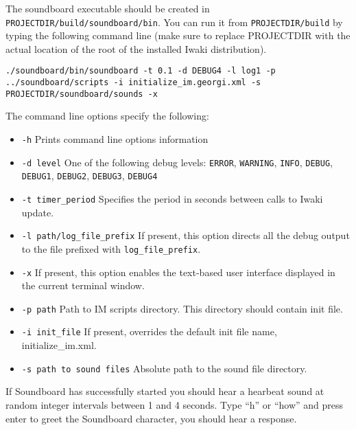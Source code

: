 The soundboard executable should be created in \texttt{PROJECTDIR/build/soundboard/bin}.
You can run it from \texttt{PROJECTDIR/build} by typing the following command line (make sure to replace PROJECTDIR with the actual location of the root of the installed Iwaki distribution).

\lstset{language=bash}
\begin{lstlisting}
./soundboard/bin/soundboard -t 0.1 -d DEBUG4 -l log1 -p ../soundboard/scripts -i initialize_im.georgi.xml -s PROJECTDIR/soundboard/sounds -x
\end{lstlisting}

The command line options specify the following:

\begin{itemize}
\item[] \texttt{-h} \hspace{2cm} Prints command line options information

\item[] \texttt{-d level} \hspace{2cm} One of the following debug levels: \texttt{ERROR}, \texttt{WARNING}, \texttt{INFO}, \texttt{DEBUG}, \texttt{DEBUG1}, \texttt{DEBUG2}, \texttt{DEBUG3}, \texttt{DEBUG4}

\item[] \texttt{-t timer\_period} \hspace{2cm} Specifies the period in seconds between calls to Iwaki update.

\item[] \texttt{-l path/log\_file\_prefix} \hspace{2cm} If present, this option directs all the debug output to the file prefixed with \texttt{log\_file\_prefix}.

\item[] \texttt{-x} \hspace{2cm} If present, this option enables the text-based user interface displayed in the current terminal window.

\item[] \texttt{-p path} \hspace{2cm} Path to IM scripts directory. This directory should contain init file.

\item[] \texttt{-i init\_file} \hspace{2cm} If present, overrides the default init file name, initialize\_im.xml. 

\item[] \texttt{-s path to sound files} \hspace{2cm} Absolute path to the sound file directory.

\end{itemize}


If Soundboard has successfully started you should hear a hearbeat sound at random integer intervals between 1 and 4 seconds. Type ``h'' or ``how'' and press enter to greet the Soundboard character, you should hear a response.

